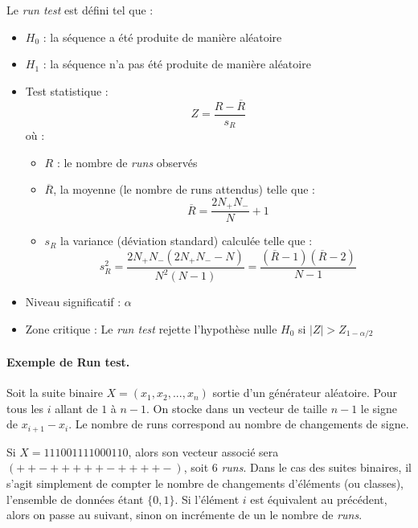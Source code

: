 Le \textit{run test} est défini tel que : 
\begin{itemize}
\item $H_0$ : la séquence a été produite de manière aléatoire
\item $H_1$ : la séquence n'a pas été produite de manière aléatoire
\item Test statistique : 
	$$ Z = \frac{R - \overline{R}}{s_R}$$
	où : 
	\begin{itemize}
	\item $R$ : le nombre de \textit{runs} observés
	\item $\overline{R}$, la moyenne (le nombre de runs attendus) telle que :
	$$\overline{R}= \frac{2 N_+ N_-}{N}+1$$
	\item $s_R$ la variance (déviation standard) calculée telle que : 
	$$s_R^2 = \frac{2 N_+ N_-(2N_+ N_- -N)}{N^2(N-1)} = \frac{(\overline{R}-1)(\overline{R}-2)}{N-1}$$
	\end{itemize}
\item Niveau significatif : $\alpha$
\item Zone critique : Le \textit{run test} rejette l'hypothèse nulle $H_0$ si $ |Z| > Z_{1-\alpha/2}$


\end{itemize}





\paragraph{Exemple de Run test.\\}
Soit la suite binaire $X=(x_1,x_2,...,x_n)$ sortie d'un générateur aléatoire. Pour tous les $i$ allant de $1$ à $n-1$. On stocke dans un vecteur de taille $n-1$ le signe de $x_{i+1}-x_i$. Le nombre de runs correspond au nombre de changements de signe.

Si $X=111001111000110$, alors son vecteur associé sera $(++-+++++-++++-)$, soit 6 \textit{runs}. Dans le cas des suites binaires, il s'agit simplement de compter le nombre de changements d'éléments (ou classes), l'ensemble de données étant $\lbrace 0,1 \rbrace$. Si l'élément $i$ est équivalent au précédent, alors on passe au suivant, sinon on incrémente de un le nombre de \textit{runs}.\\

